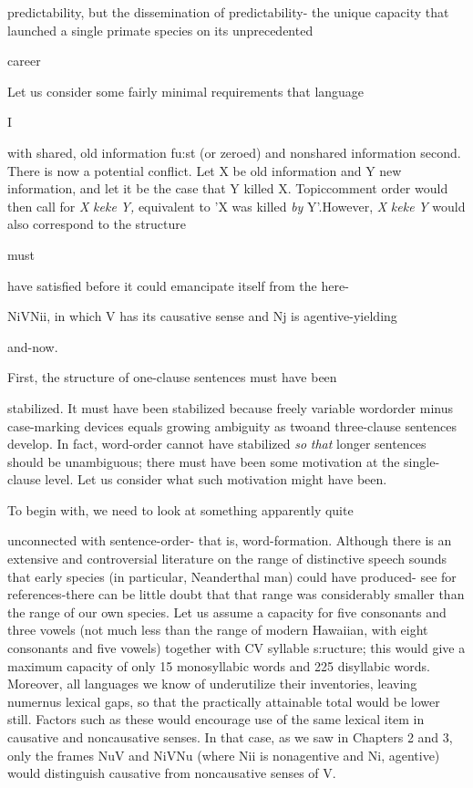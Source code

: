 predictability, but the dissemination of predictability- the unique capacity that launched a single primate species on its unprecedented


career

Let us consider some fairly minimal requirements that language

I


with shared, old information fu:st (or zeroed) and nonshared informa\-tion second. There is now a potential conflict. Let X be old information and Y new information, and let it be the case that Y killed X. Topic\-comment order would then call for \textit{X} \textit{keke} \textit{Y,} equivalent to 'X was killed \textit{by} Y'.However, \textit{X} \textit{keke} \textit{Y} would also correspond to the structure

must

have satisfied before it could emancipate itself from the here-

NiVNii, in which V has its causative sense and Nj is agentive-yielding

and-now.

First, the structure of one-clause sentences must have been

stabilized. It must have been stabilized because freely variable word\-order minus case-marking devices equals growing ambiguity as two\-and three-clause sentences develop. In fact, word-order cannot have stabilized \textit{so} \textit{that} longer sentences should be unambiguous; there must have been some motivation at the single-clause level. Let us consider what such motivation might have been.

To begin with, we need to look at something apparently quite

unconnected with sentence-order- that is, word-formation. Although there is an extensive and controversial literature on the range of distinc\-tive speech sounds that early species (in particular, Neanderthal man) could have produced- see \citet{Spuhler1977} for references-there can be little doubt that that range was considerably smaller than the range of our own species. Let us assume a capacity for five consonants and three vowels (not much less than the range of modern Hawaiian, with eight consonants and five vowels) together with CV syllable s:ructure; this would give a maximum capacity of only 15 monosyllabic words and 225 disyllabic words. Moreover, all languages we know of under\-utilize their inventories, leaving numernus lexical gaps, so that the practically attainable total would be lower still. Factors such as these would encourage use of the same lexical item in causative and non\-causative senses. In that case, as we saw in Chapters 2 and 3, only the frames NuV and NiVNu (where Nii is nonagentive and Ni, agentive) would distinguish causative from noncausative senses of V.

